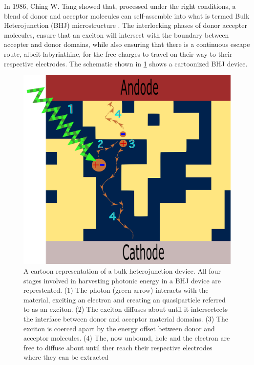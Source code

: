 In 1986, Ching W. Tang
showed that, processed under the right conditions, a blend of donor and acceptor molecules can self-assemble
into what is termed Bulk Heterojunction (BHJ) microstructure \cite{Tang1986c}. 
The interlocking phases of donor accepter molecules, ensure
that an exciton will intersect with the boundary between accepter and donor domains, while also ensuring that
there
is a continuous escape route, albeit labyrinthine, for the free charges to travel on their way to their respective
electrodes. The schematic shown in \ref{bhj} shows a cartoonized BHJ device. 



\begin{figure}
    \center
    \includegraphics[width = .9\textwidth]{figures/BHJ-figure.png}
    \caption{A cartoon representation of a bulk heterojunction device. All four stages involved in harvesting
    photonic energy in a BHJ device are represtented. (1) The photon (green arrow) interacts with the material,
    exciting an electron and creating an quasiparticle referred to as an exciton. (2) The exciton diffuses
    about until it intersectects the interface between donor and acceptor material domains. (3) The exciton is
    coerced apart by the energy offset between donor and acceptor molecules. 
    (4) The, now unbound,  hole and the electron are free to diffuse about until ther reach their respective
    electrodes where they can be extracted \cite{Fusella2019}}
    \label{bhj}
\end{figure}

